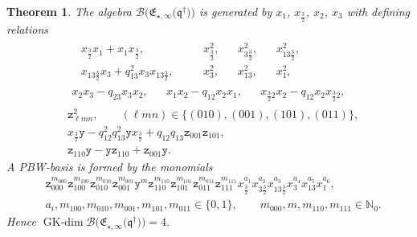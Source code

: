 \documentclass[10pt,a4paper]{amsart}
\numberwithin{equation}{section}
\newtheorem{Theorem}{Theorem}[section]
\newcommand{\GK}{\operatorname{GK-dim}}
\newcommand{\toba}{\mathscr B}
\newcommand{\N}{{\mathbb N}}
\newcommand{\yt}{\mathtt{y}}
\newcommand{\zt}{\mathtt{z}}
\newcommand{\eny}{\mathfrak{E}}
\newcommand{\enyIIb}[1]{\eny_{\star,#1}}
\newcommand{\bq}{\mathfrak{q}}
\newcommand{\bqs}{\bq^{\dagger}}
\newcommand{\tresdos}{\frac{3}{2}}
\begin{document}
\begin{Theorem} \label{th:endymion-2pts-case-a}
The algebra $\toba\big(\enyIIb{\infty}\big(\bqs\big) \big)$ is generated by $x_1$, $x_{\tresdos}$, $x_2$, $x_3$ with defining relations
\begin{align}
&\label{eq:endymion-2pts-def-rel-1}
\begin{aligned}
& x_{\tresdos}x_1+x_1x_{\tresdos}, & & x_{\tresdos}^2, & & x_{3\tresdos}^2, & & x_{13\tresdos}^2,
\\
&x_{13\tresdos}x_3+q_{13}^2x_3x_{13\tresdos},\quad & & x_3^2, & & x_{13}^2, & & x_1^2,
\end{aligned}
\\
\label{eq:endymion-2pts-def-rel-2}
& \begin{aligned}
x_2x_3-q_{23}x_3x_2, & & x_1x_2-q_{12}x_2x_1, && x_{\tresdos2}x_2-q_{12}x_2x_{\tresdos2},
\end{aligned}
\\
\label{eq:endymion-2pts-def-rel-3}
& \zt_{\ell mn}^2, \qquad (\ell mn)\in\{(010), (001), (101),(011)\},
\\
\label{eq:endymion-2pts-def-rel-4}
& x_{\tresdos}\yt - q_{12}^2q_{13}^2\yt x_{\tresdos}+q_{12}q_{13}\zt_{001}\zt_{101},
\\
\label{eq:endymion-2pts-def-rel-last}
& \zt_{110}\yt -\yt\zt_{110}+\zt_{001}\yt.
\end{align}
A PBW-basis is formed by the monomials
\begin{align}
&
\zt_{000}^{m_{000}} \zt_{100}^{m_{100}} \zt_{010}^{m_{010}} \zt_{001}^{m_{001}} \yt^m \zt_{110}^{m_{110}} \zt_{101}^{m_{101}} \zt_{011}^{m_{011}} \zt_{111}^{m_{111}}
x_{\tresdos}^{a_1} x_{3\tresdos}^{a_2} x_{13\tresdos}^{a_3} x_3^{a_4} x_{13}^{a_5} x_1^{a_6},
\nonumber\\
& a_i, m_{100}, m_{010}, m_{001}, m_{101},m_{011} \in \{0,1\}, \qquad m_{000}, m, m_{110}, m_{111} \in\N_0.\label{eq:endymion-2pts-case-a-PBW}
\end{align}
Hence $\GK \toba\big(\enyIIb{\infty}\big(\bqs\big)\big) = 4$.
\end{Theorem}
\end{document}
